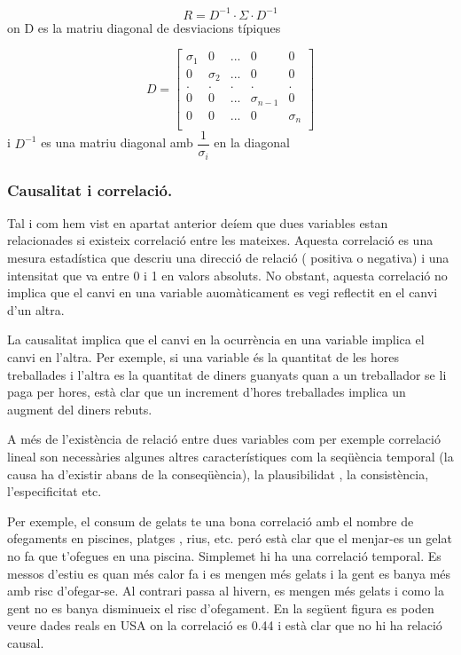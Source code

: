 \documentclass[
  catalan,
]{article}
\theoremstyle{definition}
\theoremstyle{definition}
\theoremstyle{definition}
\theoremstyle{definition}
\theoremstyle{remark}
\begin{document}
\[
R= D^{-1} ·\Sigma· D^{-1}
\]
on D es la matriu diagonal de desviacions típiques

\[
D=
\begin{bmatrix} 
\sigma_1 & 0 & ... & 0  & 0 \\
0  & \sigma_2 & ... & 0  & 0 \\  
.  & . & . & .  & . \\  
0  & 0 & ... & \sigma_{n-1} & 0  \\  
0  & 0 & ... &  0  & \sigma_n\\  
\end{bmatrix} 
\]
i \(D^{-1}\) es una matriu diagonal amb \(\dfrac {1}{\sigma_i}\) en la diagonal

\subsubsection{Causalitat i correlació.}\label{causalitat-i-correlaciuxf3.}

Tal i com hem vist en apartat anterior deíem que dues variables estan relacionades si existeix correlació entre les mateixes. Aquesta correlació es una mesura estadística que descriu una direcció de relació ( positiva o negativa) i una intensitat que va entre 0 i 1 en valors absoluts. No obstant, aquesta correlació no implica que el canvi en una variable auomàticament es vegi reflectit en el canvi d'un altra.

La causalitat implica que el canvi en la ocurrència en una variable implica el canvi en l'altra. Per exemple, si una variable és la quantitat de les hores treballades i l'altra es la quantitat de diners guanyats quan a un treballador se li paga per hores, està clar que un increment d'hores treballades implica un augment del diners rebuts.

A més de l'existència de relació entre dues variables com per exemple correlació lineal son necessàries algunes altres característiques com la seqüència temporal (la causa ha d'existir abans de la conseqüència), la plausibilidat , la consistència, l'especificitat etc.

Per exemple, el consum de gelats te una bona correlació amb el nombre de ofegaments en piscines, platges , rius, etc. peró està clar que el menjar-es un gelat no fa que t'ofegues en una piscina. Simplemet hi ha una correlació temporal. Es messos d'estiu es quan més calor fa i es mengen més gelats i la gent es banya més amb risc d'ofegar-se. Al contrari passa al hivern, es mengen més gelats i como la gent no es banya disminueix el risc d'ofegament. En la següent figura es poden veure dades reals en USA on la correlació es 0.44 i està clar que no hi ha relació causal.
\end{document}
